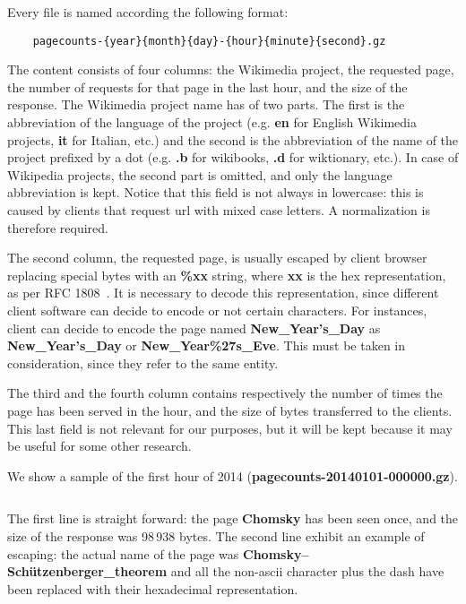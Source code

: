 Every file is named according the following format:
\begin{verbatim}
    pagecounts-{year}{month}{day}-{hour}{minute}{second}.gz
\end{verbatim}
The content consists of four columns: the Wikimedia project, the requested page, the number of requests for that page in the last hour, and the size of the response.
The Wikimedia project name has of two parts.
The first is the abbreviation of the language of the project (e.g. \textbf{en} for English Wikimedia projects, \textbf{it} for Italian, etc.) and the second is the abbreviation of the name of the project prefixed by a dot (e.g. \textbf{.b} for wikibooks, \textbf{.d} for wiktionary, etc.).
In case of Wikipedia projects, the second part is omitted, and only the language abbreviation is kept.
Notice that this field is not always in lowercase: this is caused by clients that request url with mixed case letters.
A normalization is therefore required.

The second column, the requested page, is usually escaped by client browser replacing special bytes with an \textbf{\%xx} string, where \textbf{xx} is the hex representation, as per RFC 1808~\cite{rfc1808}.
It is necessary to decode this representation, since different client software can decide to encode or not certain characters.
For instances, client can decide to encode the page named \textbf{New\_Year's\_Day} as \textbf{New\_Year's\_Day} or \textbf{New\_Year\%27s\_Eve}.
This must be taken in consideration, since they refer to the same entity.

The third and the fourth column contains respectively the number of times the page has been served in the hour, and the size of bytes transferred to the clients.
This last field is not relevant for our purposes, but it will be kept because it may be useful for some other research.

We show a sample of the first hour of 2014 (\textbf{pagecounts-20140101-000000.gz}).

\inputminted[breaklines=true]{text}{assets/pagecounts_extract_first_hour.txt}


The first line is straight forward: the page \textbf{Chomsky} has been seen once, and the size of the response was 98\,938 bytes.
The second line exhibit an example of escaping: the actual name of the page was \textbf{Chomsky–Schützenberger\_theorem} and all the non-ascii character plus the dash have been replaced with their hexadecimal representation.


